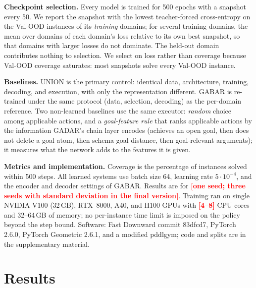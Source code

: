 \documentclass[letterpaper]{article} %
\newcommand{\gadar}{GADAR}                    %
\newcommand{\union}{UNION}                    %
\newcommand{\todonum}[1]{\textcolor{red}{\textbf{[#1]}}}
\begin{document}
\textbf{Checkpoint selection.} Every model is trained for 500 epochs with a
snapshot every 50. We report the snapshot with the lowest teacher-forced
cross-entropy on the Val-OOD instances of its \emph{training} domains; for
several training domains, the mean over domains of each domain's loss
relative to its own best snapshot, so that domains with larger losses do not
dominate. The held-out domain contributes nothing to selection. We select on
loss rather than coverage because Val-OOD coverage saturates: most
snapshots solve every Val-OOD instance.

\textbf{Baselines.} \union{} is the primary control: identical data,
architecture, training, decoding, and execution, with only the
representation different. GABAR \citep{gabar} is re-trained under the same
protocol (data, selection, decoding) as the per-domain reference. Two
non-learned baselines use the same executor: \emph{random} choice among
applicable actions, and a \emph{goal-feature rule} that ranks applicable
actions by the information \gadar{}'s chain layer encodes (achieves an open
goal, then does not delete a goal atom, then schema goal distance, then
goal-relevant arguments); it measures what the network adds to the
features it is given.

\textbf{Metrics and implementation.} Coverage is the percentage of
instances solved within 500 steps. All learned systems use batch size 64,
learning rate $5\cdot10^{-4}$, and the encoder and decoder settings of
GABAR. Results are for \todonum{one seed; three seeds with standard
deviation in the final version}. Training ran on single NVIDIA V100 (32\,GB),
RTX~8000, A40, and H100 GPUs with \todonum{4--8} CPU cores and 32--64\,GB of
memory; no per-instance time limit is imposed on the policy beyond the step
bound. Software: Fast Downward commit 83dfcd7, PyTorch 2.6.0, PyTorch
Geometric 2.6.1, and a modified pddlgym; code and splits are in the
supplementary material.

\section{Results}
\end{document}
